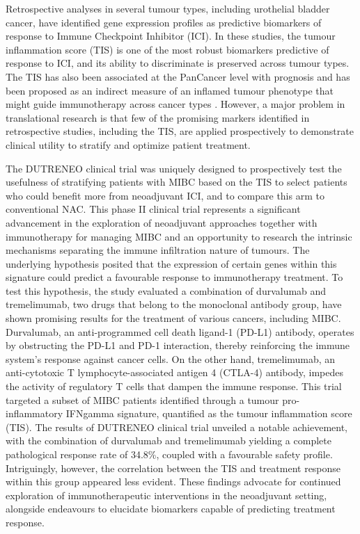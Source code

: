 Retrospective analyses in several tumour types, including urothelial bladder cancer, have identified gene expression profiles as predictive biomarkers of response to Immune Checkpoint Inhibitor (ICI). In these studies, the tumour inflammation score (TIS) is one of the most robust biomarkers predictive of response to ICI, and its ability to discriminate is preserved across tumour types. The TIS has also been associated at the PanCancer level with prognosis and has been proposed as an indirect measure of an inflamed tumour phenotype that might guide immunotherapy across cancer types\cite{Danaher2018} \cite{Damotte2019}. However, a major problem in translational research is that few of the promising markers identified in retrospective studies, including the TIS, are applied prospectively to demonstrate clinical utility to stratify and optimize patient treatment.

The DUTRENEO clinical trial\cite{DUTRENEO} was uniquely designed to prospectively test the usefulness of stratifying patients with MIBC based on the TIS to select patients who could benefit more from neoadjuvant ICI, and to compare this arm to conventional NAC. This phase II clinical trial represents a significant advancement in the exploration of neoadjuvant approaches together with immunotherapy for managing MIBC and an opportunity to research the intrinsic mechanisms separating the immune infiltration nature of tumours. The underlying hypothesis posited that the expression of certain genes within this signature could predict a favourable response to immunotherapy treatment. To test this hypothesis, the study evaluated a combination of durvalumab and tremelimumab, two drugs that belong to the monoclonal antibody group, have shown promising results for the treatment of various cancers, including MIBC. Durvalumab, an anti-programmed cell death ligand-1 (PD-L1) antibody, operates by obstructing the PD-L1 and PD-1 interaction, thereby reinforcing the immune system’s response against cancer cells. On the other hand, tremelimumab, an anti-cytotoxic T lymphocyte-associated antigen 4 (CTLA-4) antibody, impedes the activity of regulatory T cells that dampen the immune response. This trial targeted a subset of MIBC patients identified through a tumour pro-inflammatory IFNgamma signature, quantified as the tumour inflammation score (TIS). The results of DUTRENEO clinical trial unveiled a notable achievement, with the combination of durvalumab and tremelimumab yielding a complete pathological response rate of 34.8\%, coupled with a favourable safety profile. Intriguingly, however, the correlation between the TIS and treatment response within this group appeared less evident. These findings advocate for continued exploration of immunotherapeutic interventions in the neoadjuvant setting, alongside endeavours to elucidate biomarkers capable of predicting treatment response. 

